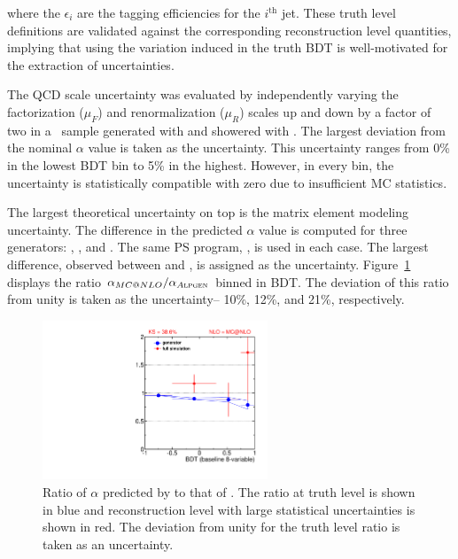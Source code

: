 \noindent where the $\epsilon_i$ are the tagging efficiencies for the
$i^{\textrm{th}}$ jet. These truth level definitions are validated
against the corresponding reconstruction level quantities, implying
that using the variation induced in the truth BDT is well-motivated for
the extraction of uncertainties. 

The QCD scale uncertainty was evaluated by independently varying the factorization
($\mu_F$) and renormalization ($\mu_R$) scales up and down by a factor
of two in a \ttbar~sample generated with \MCATNLO and showered
with \HERWIG. The largest deviation from the nominal $\alpha$ value is
taken as the uncertainty. This uncertainty ranges from 0\% in the
lowest BDT bin to 5\% in the highest. However, in every bin, the
uncertainty is statistically compatible with zero due to insufficient
MC statistics. 

The largest theoretical uncertainty on top is the matrix element
modeling uncertainty. The difference in the predicted $\alpha$ value
is computed for three generators: \MCATNLO, \POWHEG, and \ALPGEN. The
same PS program, \HERWIG, is used in each case. The largest difference,
observed between \MCATNLO and \ALPGEN, is assigned as the
uncertainty. Figure~\ref{chap:analysis:fig:alpha_ratio} displays the
ratio $\alpha_{MC@NLO}/\alpha_{A\textsc{lpgen}}$ binned in BDT. The deviation
of this ratio from unity is taken as the uncertainty-- 10\%, 12\%, and
21\%, respectively. 

\begin{figure}[h]
  \centering
  \includegraphics[width=0.6\textwidth]{fig/analysis/ttbar_sys_cjv_mcatnlo03.pdf}
   \caption{Ratio of $\alpha$ predicted by \ALPGEN to that
  of \MCATNLO. The ratio at truth level is shown in {\color{blue}blue} and reconstruction level
  with large statistical uncertainties is shown in
  {\color{red}red}. The deviation from unity for the truth level ratio is taken as an uncertainty.}
  \label{chap:analysis:fig:alpha_ratio}
\end{figure}


